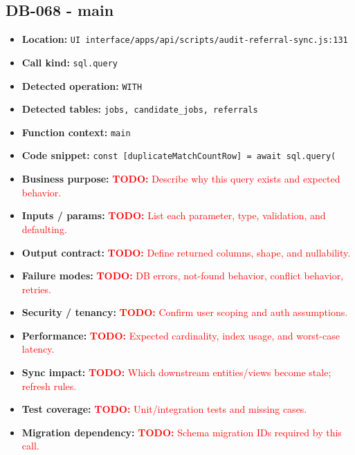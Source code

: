 \documentclass[11pt]{article}
\newcommand{\todoitem}[1]{\textcolor{red}{\textbf{TODO:} #1}}
\begin{document}
\subsection{DB-068 - main}
\begin{itemize}[leftmargin=1.5em]
\item \textbf{Location:} \texttt{UI interface/apps/api/scripts/audit-referral-sync.js:131}
\item \textbf{Call kind:} \texttt{sql.query}
\item \textbf{Detected operation:} \texttt{WITH}
\item \textbf{Detected tables:} \texttt{jobs, candidate\_jobs, referrals}
\item \textbf{Function context:} \texttt{main}
\item \textbf{Code snippet:} \texttt{const [duplicateMatchCountRow] = await sql.query(}
\item \textbf{Business purpose:} \todoitem{Describe why this query exists and expected behavior.}
\item \textbf{Inputs / params:} \todoitem{List each parameter, type, validation, and defaulting.}
\item \textbf{Output contract:} \todoitem{Define returned columns, shape, and nullability.}
\item \textbf{Failure modes:} \todoitem{DB errors, not-found behavior, conflict behavior, retries.}
\item \textbf{Security / tenancy:} \todoitem{Confirm user scoping and auth assumptions.}
\item \textbf{Performance:} \todoitem{Expected cardinality, index usage, and worst-case latency.}
\item \textbf{Sync impact:} \todoitem{Which downstream entities/views become stale; refresh rules.}
\item \textbf{Test coverage:} \todoitem{Unit/integration tests and missing cases.}
\item \textbf{Migration dependency:} \todoitem{Schema migration IDs required by this call.}
\end{itemize}
\end{document}
